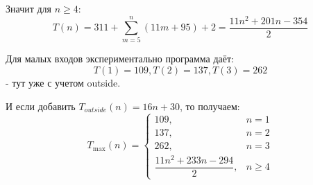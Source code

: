 \documentclass[12pt]{article}
\begin{document}
Значит для $n\geq4$:
\[
T(n)
=311+\sum_{m=5}^{n}(11m+95)+2
=\frac{11n^2+201n-354}{2}
\]

Для малых входов экспериментально программа даёт:
\[
T(1)=109,
T(2)=137,
T(3)=262
\]
- тут уже с учетом outside.

И если добавить $T_{outside}(n)=16n+30$, то получаем:
\[
T_{\max}(n)=
\begin{cases}
109, & n=1\\
137, & n=2\\
262, & n=3\\
\dfrac{11n^2+233n-294}{2}, & n\geq 4
\end{cases}
\]
\end{document}
